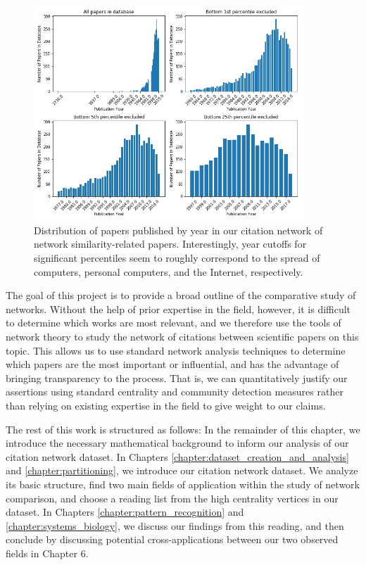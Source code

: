 \documentclass[12pt]{thesis}
\theoremstyle{plain}
\theoremstyle{definition}
\theoremstyle{remark}
\begin{document}
\begin{figure}[t!]
\centering
\includegraphics[width=0.9\textwidth]{year_distribution.png}
\caption{Distribution of papers published by year in our citation network of network similarity-related papers. Interestingly, year cutoffs for significant percentiles seem to roughly correspond to the spread of computers, personal computers, and the Internet, respectively.}
\label{fig:year_distributions}
\end{figure}

The goal of this project is to provide a broad outline of the comparative study of networks. Without the help of prior expertise in the field, however, it is difficult to determine which works are most relevant, and we therefore use the tools of network theory to study the network of citations between scientific papers on this topic. This allows us to use standard network analysis techniques to determine which papers are the most important or influential, and has the advantage of bringing transparency to the process. That is, we can quantitatively justify our assertions using standard centrality and community detection measures rather than relying on existing expertise in the field to give weight to our claims.

The rest of this work is structured as follows: In the remainder of this chapter, we introduce the necessary mathematical background to inform our analysis of our citation network dataset. In Chapters \ref{chapter:dataset_creation_and_analysis} and \ref{chapter:partitioning}, we introduce our citation network dataset. We analyze its basic structure, find two main fields of application within the study of network comparison, and choose a reading list from the high centrality vertices in our dataset. In Chapters \ref{chapter:pattern_recognition} and \ref{chapter:systems_biology}, we discuss our findings from this reading, and then conclude by discussing potential cross-applications between our two observed fields in Chapter 6.
\end{document}
